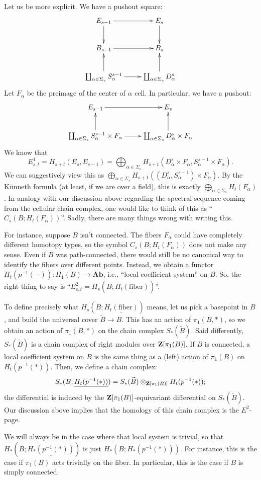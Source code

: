 Let us be more explicit. We have a pushout square:
\begin{equation*}
    \xymatrix{
	E_{s-1}\ar[r]\ar[d] & E_s\ar[d]\\
	B_{s-1}\ar[r] & B_s\\
	\coprod_{\alpha\in\Sigma_s}S^{s-1}_\alpha\ar[r]\ar[u] & \coprod_{\alpha\in\Sigma_s} D^s_\alpha\ar[u]
    }
\end{equation*}
Let $F_\alpha$ be the preimage of the center of $\alpha$ cell. In particular,
we have a pushout:
\begin{equation*}
    \xymatrix{
	E_{s-1}\ar[r] & E_s\\
	\coprod_{\alpha\in\Sigma_s} S^{s-1}_\alpha\times F_\alpha\ar[r]\ar[u] & \coprod_{\alpha\in\Sigma_s} D^s_\alpha \times F_\alpha\ar[u]
    }
\end{equation*}
We know that
$$E^1_{s,t} = H_{s+t}(E_s,E_{s-1}) = \bigoplus_{\alpha\in \Sigma_s}
H_{s+t}(D^s_\alpha\times F_\alpha, S^{s-1}_\alpha\times F_\alpha).$$
We can suggestively view this as $\bigoplus_{\alpha\in\Sigma_s}
H_{s+1}((D^s_\alpha, S^{s-1}_\alpha)\times F_\alpha)$. By the K\"unneth
formula (at least, if we are over a field), this is exactly
$\bigoplus_{\alpha\in\Sigma_s} H_t(F_\alpha)$. In analogy with our discussion
above regarding the spectral sequence coming from the cellular chain complex,
one would like to think of this as ``$C_s(B;H_t(F_\alpha))$''. Sadly, there are
many things wrong with writing this.

For instance, suppose $B$ isn't connected. The fibers $F_\alpha$ could have
completely different homotopy types, so the symbol $C_s(B;H_t(F_\alpha))$
does not make any sense. Even if $B$ was path-connected, there would still be
no canonical way to identify the fibers over different points. Instead, we
obtain a functor $H_t(p^{-1}(-)):\Pi_1(B) \to \mathbf{Ab}$, i.e., ``local
coefficient system'' on $B$. So, the right thing to say is ``$E^2_{s,t} =
H_s(B;\underline{H_t(\mathrm{fiber})})$''.

To define precisely what $H_s(B;\underline{H_t(\mathrm{fiber})})$ means, let us
pick a basepoint in $B$, and build the universal cover $\widetilde{B}\to B$.
This has an action of $\pi_1(B,\ast)$, so we obtain an action of
$\pi_1(B,\ast)$ on the chain complex $S_\ast(\widetilde{B})$. Said differently,
$S_\ast(\widetilde{B})$ is a chain complex of right modules over
$\mathbf Z[\pi_1(B)]$. If $B$ is connected, a local coefficient system on $B$ is the
same thing as a (left) action of $\pi_1(B)$ on $H_t(p^{-1}(\ast))$. Then, we
define a chain complex:
$$
S_\ast(B;\underline{H_t(p^{-1}(\ast))}) = S_\ast(\widetilde{B})
\otimes_{\mathbf Z[\pi_1(B)]} H_t(p^{-1}(\ast));
$$
the differential is induced by the $\mathbf Z[\pi_1(B)]$-equivariant differential on
$S_\ast(\widetilde{B})$. Our discussion above implies that the homology of this
chain complex is the $E^2$-page.

We will always be in the case where that local system is trivial, so that
$H_\ast(B;\underline{H_\ast(p^{-1}(\ast))})$ is just
$H_\ast(B;H_\ast(p^{-1}(\ast)))$. For instance, this is the case if $\pi_1(B)$
acts trivially on the fiber. In particular, this is the case if $B$ is simply
connected. 
